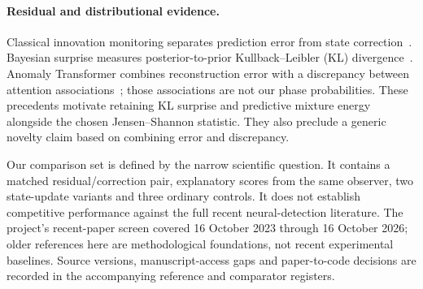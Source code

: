 \paragraph{Residual and distributional evidence.}
Classical innovation monitoring separates prediction error from state correction~\cite{willsky1976}. Bayesian surprise measures posterior-to-prior Kullback--Leibler (KL) divergence~\cite{itti2005}. Anomaly Transformer combines reconstruction error with a discrepancy between attention associations~\cite{xu2022}; those associations are not our phase probabilities. These precedents motivate retaining KL surprise and predictive mixture energy alongside the chosen Jensen--Shannon statistic. They also preclude a generic novelty claim based on combining error and discrepancy.

Our comparison set is defined by the narrow scientific question. It contains a matched residual/correction pair, explanatory scores from the same observer, two state-update variants and three ordinary controls. It does not establish competitive performance against the full recent neural-detection literature. The project's recent-paper screen covered 16 October 2023 through 16 October 2026; older references here are methodological foundations, not recent experimental baselines. Source versions, manuscript-access gaps and paper-to-code decisions are recorded in the accompanying reference and comparator registers.

